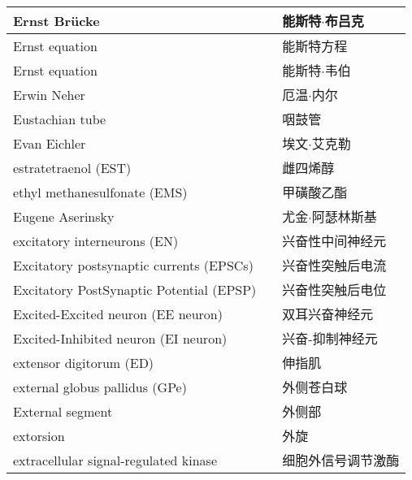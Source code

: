 \begin{longtable}{lll}
	\midrule
	Ernst Brücke    &&  能斯特$\cdot$布吕克  \\
	
	\midrule
	Ernst equation    &&  能斯特方程  \\
	
	\midrule
	Ernst equation    &&  能斯特$\cdot$韦伯  \\
	
	\midrule
	Erwin Neher    &&  厄温$\cdot$内尔  \\
	
	\midrule
	Eustachian tube    &&  咽鼓管  \\
	
	\midrule
	Evan Eichler    &&  埃文$\cdot$艾克勒  \\
	
	\midrule
	estratetraenol (EST)   &&  雌四烯醇  \\
	
	\midrule
	ethyl methanesulfonate (EMS)    &&  甲磺酸乙酯  \\
	
	\midrule
	Eugene Aserinsky    &&  尤金$\cdot$阿瑟林斯基  \\
	
	\midrule
	excitatory interneurons  (EN)  &&  兴奋性中间神经元  \\
	
	\midrule
	Excitatory postsynaptic currents (EPSCs)     &&  兴奋性突触后电流  \\
	
	\midrule
	Excitatory PostSynaptic Potential (EPSP)     &&  兴奋性突触后电位  \\
	
	\midrule
	Excited-Excited neuron (EE neuron)     &&  双耳兴奋神经元  \\
	
	\midrule
	Excited-Inhibited neuron (EI neuron)     && 兴奋-抑制神经元   \\
	
	\midrule
	extensor digitorum (ED)     && 伸指肌   \\
	
	\midrule
	external globus pallidus (GPe)     && 外侧苍白球   \\
	
	\midrule
	External segment     && 外侧部   \\
	
	\midrule
	extorsion     && 外旋   \\
	
	\midrule
	extracellular signal-regulated kinase     && 细胞外信号调节激酶   \\
	

\end{longtable}
